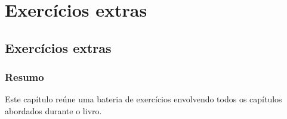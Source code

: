 
\part[Exercícios extras]
{Exercícios extras}


\chapter[Exercícios extras]
{Exercícios extras}



\section*{Resumo}

Este capítulo reúne uma bateria de exercícios envolvendo todos os capítulos abordados durante o livro.

